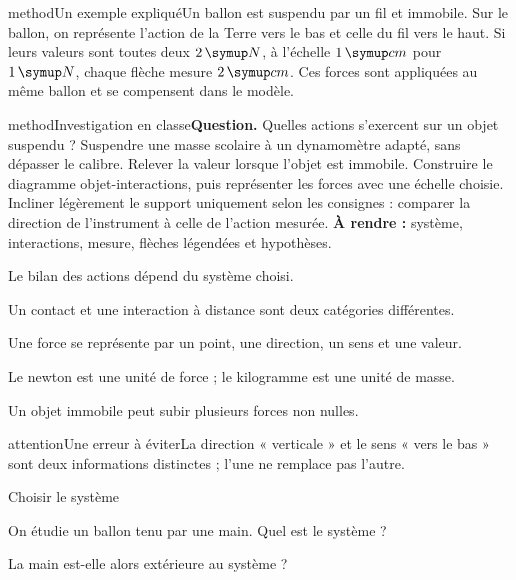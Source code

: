 \begin{pcEncadre}{method}{Un exemple expliqué}Un ballon est suspendu par un fil et immobile. Sur le ballon, on représente l’action de la Terre vers le bas et celle du fil vers le haut. Si leurs valeurs sont toutes deux $2\unite N$, à l’échelle $1\unite{cm}$ pour $1\unite N$, chaque flèche mesure $2\unite{cm}$. Ces forces sont appliquées au même ballon et se compensent dans le modèle.\end{pcEncadre}
\label{activite-10}
\begin{pcEncadre}{method}{Investigation en classe}\textbf{Question.} Quelles actions s’exercent sur un objet suspendu ? Suspendre une masse scolaire à un dynamomètre adapté, sans dépasser le calibre. Relever la valeur lorsque l’objet est immobile. Construire le diagramme objet-interactions, puis représenter les forces avec une échelle choisie. Incliner légèrement le support uniquement selon les consignes : comparer la direction de l’instrument à celle de l’action mesurée. \textbf{À rendre :} système, interactions, mesure, flèches légendées et hypothèses.\end{pcEncadre}
\begin{questions}
\item Le bilan des actions dépend du système choisi.
\item Un contact et une interaction à distance sont deux catégories différentes.
\item Une force se représente par un point, une direction, un sens et une valeur.
\item Le newton est une unité de force ; le kilogramme est une unité de masse.
\item Un objet immobile peut subir plusieurs forces non nulles.
\end{questions}
\begin{pcEncadre}{attention}{Une erreur à éviter}La direction « verticale » et le sens « vers le bas » sont deux informations distinctes ; l’une ne remplace pas l’autre.\end{pcEncadre}
\pcGrille
\clearpage{}
\par\noindent\begin{minipage}{\linewidth}
\begin{exercice}[1]{Choisir le système}
\begin{questions}
\item On étudie un ballon tenu par une main. Quel est le système ?
\item La main est-elle alors extérieure au système ?
\end{questions}
\end{exercice}
\end{minipage}
